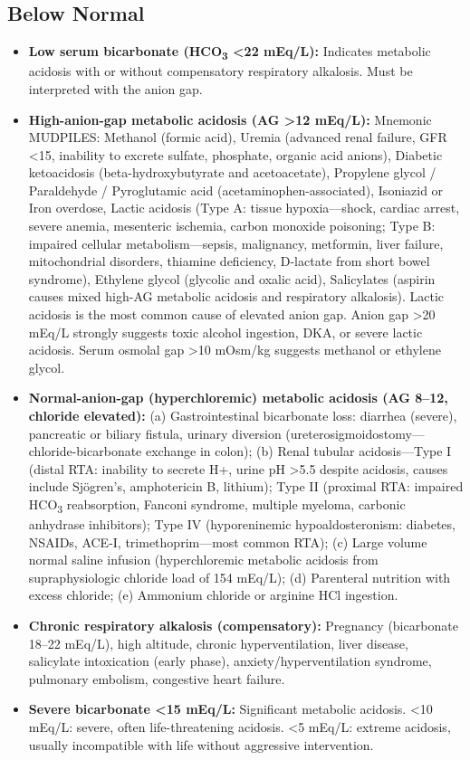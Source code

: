 \subsection*{Below Normal}
\begin{itemize}
  \item \textbf{Low serum bicarbonate (HCO\textsubscript{3} <22 mEq/L):} Indicates metabolic acidosis with or without compensatory respiratory alkalosis. Must be interpreted with the anion gap.
  \item \textbf{High-anion-gap metabolic acidosis (AG >12 mEq/L):} Mnemonic MUDPILES: Methanol (formic acid), Uremia (advanced renal failure, GFR <15, inability to excrete sulfate, phosphate, organic acid anions), Diabetic ketoacidosis (beta-hydroxybutyrate and acetoacetate), Propylene glycol / Paraldehyde / Pyroglutamic acid (acetaminophen-associated), Isoniazid or Iron overdose, Lactic acidosis (Type A: tissue hypoxia---shock, cardiac arrest, severe anemia, mesenteric ischemia, carbon monoxide poisoning; Type B: impaired cellular metabolism---sepsis, malignancy, metformin, liver failure, mitochondrial disorders, thiamine deficiency, D-lactate from short bowel syndrome), Ethylene glycol (glycolic and oxalic acid), Salicylates (aspirin causes mixed high-AG metabolic acidosis and respiratory alkalosis). Lactic acidosis is the most common cause of elevated anion gap. Anion gap >20 mEq/L strongly suggests toxic alcohol ingestion, DKA, or severe lactic acidosis. Serum osmolal gap >10 mOsm/kg suggests methanol or ethylene glycol.
  \item \textbf{Normal-anion-gap (hyperchloremic) metabolic acidosis (AG 8--12, chloride elevated):} (a) Gastrointestinal bicarbonate loss: diarrhea (severe), pancreatic or biliary fistula, urinary diversion (ureterosigmoidostomy---chloride-bicarbonate exchange in colon); (b) Renal tubular acidosis---Type I (distal RTA: inability to secrete H+, urine pH >5.5 despite acidosis, causes include Sj\"{o}gren's, amphotericin B, lithium); Type II (proximal RTA: impaired HCO\textsubscript{3} reabsorption, Fanconi syndrome, multiple myeloma, carbonic anhydrase inhibitors); Type IV (hyporeninemic hypoaldosteronism: diabetes, NSAIDs, ACE-I, trimethoprim---most common RTA); (c) Large volume normal saline infusion (hyperchloremic metabolic acidosis from supraphysiologic chloride load of 154 mEq/L); (d) Parenteral nutrition with excess chloride; (e) Ammonium chloride or arginine HCl ingestion.
  \item \textbf{Chronic respiratory alkalosis (compensatory):} Pregnancy (bicarbonate 18--22 mEq/L), high altitude, chronic hyperventilation, liver disease, salicylate intoxication (early phase), anxiety/hyperventilation syndrome, pulmonary embolism, congestive heart failure.
  \item \textbf{Severe bicarbonate <15 mEq/L:} Significant metabolic acidosis. <10 mEq/L: severe, often life-threatening acidosis. <5 mEq/L: extreme acidosis, usually incompatible with life without aggressive intervention.
\end{itemize}

